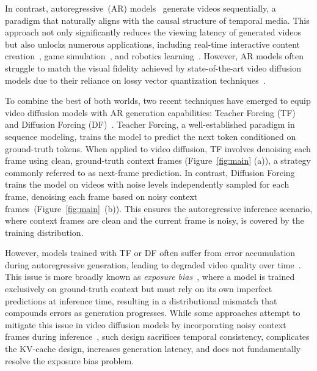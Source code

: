 \documentclass{article}
\begin{document}
In contrast, autoregressive~(AR) models~\cite{yan2021videogpt,ge2022long,yu2023language,hong2022cogvideo, kondratyuk2024videopoet} generate videos sequentially, a paradigm that naturally aligns with the causal structure of temporal media.
This approach not only significantly reduces the viewing latency of generated videos but also unlocks numerous applications, including real-time interactive content creation~\cite{chen2024streaming,liang2025looking}, game simulation~\cite{oasis2024,yu2025gamefactory,parkerholder2024genie2, valevski2025diffusion}, and robotics learning~\cite{yang2023learning, yu2024learning, li2025unified}.
However, AR models often struggle to match the visual fidelity achieved by state-of-the-art video diffusion models due to their reliance on lossy vector quantization techniques~\cite{van2017neural}.

To combine the best of both worlds, two recent techniques have emerged to equip video diffusion models with AR generation capabilities: Teacher Forcing (TF)~\cite{hu2024acdit,jin2024pyramidal,gao2024ca2,zhang2025test} and Diffusion Forcing (DF)~\cite{chen2024diffusion,yin2025causvid,song2025history,gu2025long,magi1,chen2025skyreels}.
Teacher Forcing, a well-established paradigm in sequence modeling, trains the model to predict the next token conditioned on ground-truth tokens.
When applied to video diffusion, TF involves denoising each frame using clean, ground-truth context frames (Figure~\ref{fig:main} (a)), a strategy commonly referred to as next-frame prediction.
In contrast, Diffusion Forcing trains the model on videos with noise levels independently sampled for each frame, denoising each frame based on noisy context frames~(Figure~\ref{fig:main}~(b)).
This ensures the autoregressive inference scenario, where context frames are clean and the current frame is noisy, is covered by the training distribution.

However, models trained with TF or DF often suffer from error accumulation during autoregressive generation,
leading to degraded video quality over time~\cite{yin2025causvid,zhang2025packing,wang2025error}. This issue is more broadly known as \textit{exposure bias}~\cite{schmidt2019generalization,ning2024elucidating}, where a model is trained exclusively on ground-truth context but must rely on its own imperfect predictions at inference time, resulting in a distributional mismatch that compounds errors as generation progresses. While some approaches attempt to mitigate this issue in video diffusion models by incorporating noisy context frames during inference~\cite{chen2024diffusion,oasis2024,zhang2025packing},
such design sacrifices temporal consistency, complicates the KV-cache design, increases generation latency, and does not fundamentally resolve the exposure bias problem.
\end{document}
